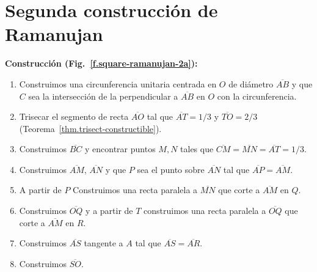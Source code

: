 

\section{Segunda construcción de Ramanujan}\label{s.square-ramanujan-second}

\textbf{Construcción  (Fig.~\ref{f.square-ramanujan-2a}):}
\begin{enumerate}

\item Construimos una circunferencia unitaria centrada en $O$ de diámetro $\overline{AB}$ y que $C$ sea la intersección de la perpendicular a $\overline{AB}$ en $O$ con la circunferencia.

\item Trisecar el segmento de recta $\overline{AO}$ tal que $\overline{AT}=1/3$ y $\overline{TO}=2/3$ (Teorema~\ref{thm.trisect-constructible}).

\item Construimos $\overline{BC}$ y encontrar puntos $M,N$ tales que $\overline{CM}=\overline{MN}=\overline{AT}=1/3$.

\item Construimos $\overline{AM}$, $\overline{AN}$ y que $P$ sea el punto sobre $\overline{AN}$ tal que $\overline{AP}=\overline{AM}$.

\item A partir de $P$ Construimos una recta paralela a $\overline{MN}$ que corte a $\overline{AM}$ en $Q$.

\item Construimos $\overline{OQ}$ y a partir de $T$ construimos una recta paralela a $\overline{OQ}$ que corte a $\overline{AM}$ en $R$.

\item Construimos $\overline{AS}$ tangente a $A$ tal que $\overline{AS}=\overline{AR}$.

\item Construimos $\overline{SO}$.
\end{enumerate}

